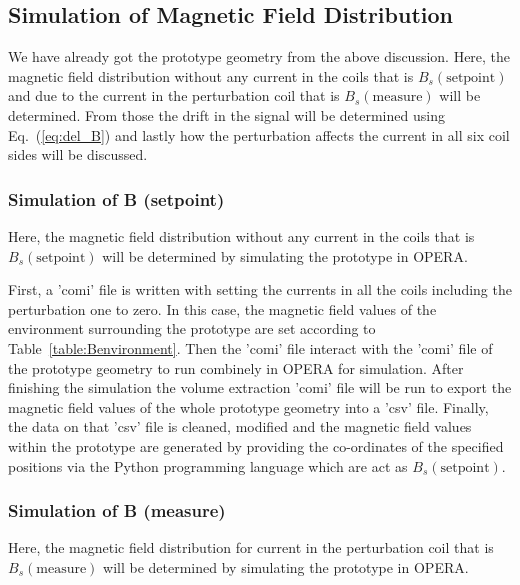 \subsection{Simulation of Magnetic Field Distribution}\label{sec:pSim}

We have already got the prototype geometry  from the above discussion. Here, the magnetic field distribution without any current in the coils that is $B_s(\text{setpoint})$ and due to the current in the perturbation coil that is $B_s(\text{measure})$ will be determined. From those the drift in the signal will be determined using Eq.~(\ref{eq:del_B}) and lastly how the perturbation affects the current in all six coil sides will be discussed. 

\subsubsection{Simulation of B (setpoint)}
 
Here, the magnetic field distribution without any current in the coils that is $B_s(\text{setpoint})$ will be determined by simulating the prototype in OPERA.

First, a 'comi' file is written with setting the currents in all the coils including the perturbation one to zero. In this case, the magnetic field values of the environment surrounding the prototype are set according to Table~\ref{table:Benvironment}. Then the 'comi' file interact with the 'comi' file of the prototype geometry to run combinely in OPERA for simulation. After finishing the simulation the volume extraction 'comi' file will be run to export the magnetic field values of the whole prototype geometry into a 'csv' file. Finally, the data on that 'csv' file is cleaned, modified and the magnetic field values within the prototype are generated by providing the co-ordinates of the specified positions via the Python programming language which are act as $B_s(\text{setpoint})$.

\subsubsection{Simulation of B (measure)}

Here, the magnetic field distribution for current in the perturbation coil that is $B_s(\text{measure})$ will be determined by simulating the prototype in OPERA.


